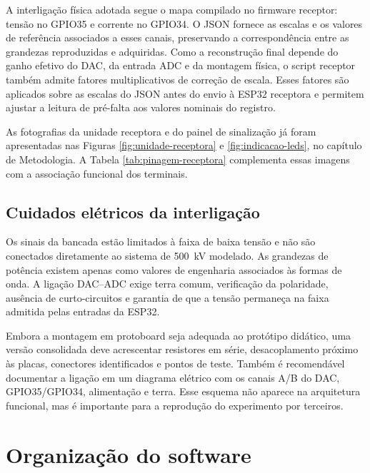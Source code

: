 A interligação física adotada segue o mapa compilado no firmware receptor: tensão no GPIO35 e corrente no GPIO34. O JSON fornece as escalas e os valores de referência associados a esses canais, preservando a correspondência entre as grandezas reproduzidas e adquiridas. Como a reconstrução final depende do ganho efetivo do DAC, da entrada ADC e da montagem física, o script receptor também admite fatores multiplicativos de correção de escala. Esses fatores são aplicados sobre as escalas do JSON antes do envio à ESP32 receptora e permitem ajustar a leitura de pré-falta aos valores nominais do registro.

As fotografias da unidade receptora e do painel de sinalização já foram apresentadas nas Figuras \ref{fig:unidade-receptora} e \ref{fig:indicacao-leds}, no capítulo de Metodologia. A Tabela \ref{tab:pinagem-receptora} complementa essas imagens com a associação funcional dos terminais.

\subsection{Cuidados elétricos da interligação}

Os sinais da bancada estão limitados à faixa de baixa tensão e não são conectados diretamente ao sistema de \SI{500}{\kilo\volt} modelado. As grandezas de potência existem apenas como valores de engenharia associados às formas de onda. A ligação DAC--ADC exige terra comum, verificação da polaridade, ausência de curto-circuitos e garantia de que a tensão permaneça na faixa admitida pelas entradas da ESP32.

Embora a montagem em protoboard seja adequada ao protótipo didático, uma versão consolidada deve acrescentar resistores em série, desacoplamento próximo às placas, conectores identificados e pontos de teste. Também é recomendável documentar a ligação em um diagrama elétrico com os canais A/B do DAC, GPIO35/GPIO34, alimentação e terra. Esse esquema não aparece na arquitetura funcional, mas é importante para a reprodução do experimento por terceiros.

\section{Organização do software}
\label{sec:organizacao-software}

